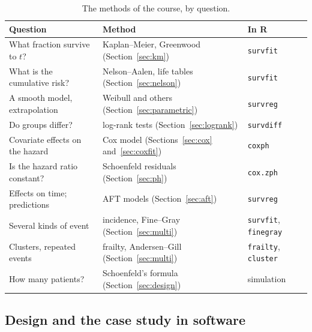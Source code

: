 \documentclass[11pt,a4paper]{article}
\numberwithin{equation}{section}
\theoremstyle{definition}
\begin{document}
\begin{table}[H]
\centering
\small
\begin{tabular}{lll}
\hline
Question & Method & In R \\
\hline
What fraction survive to $t$? & Kaplan--Meier, Greenwood (Section~\ref{sec:km}) & \texttt{survfit} \\
What is the cumulative risk? & Nelson--Aalen, life tables (Section~\ref{sec:nelson}) & \texttt{survfit} \\
A smooth model, extrapolation & Weibull and others (Section~\ref{sec:parametric}) & \texttt{survreg} \\
Do groups differ? & log-rank tests (Section~\ref{sec:logrank}) & \texttt{survdiff} \\
Covariate effects on the hazard & Cox model (Sections~\ref{sec:cox} and~\ref{sec:coxfit}) & \texttt{coxph} \\
Is the hazard ratio constant? & Schoenfeld residuals (Section~\ref{sec:ph}) & \texttt{cox.zph} \\
Effects on time; predictions & AFT models (Section~\ref{sec:aft}) & \texttt{survreg} \\
Several kinds of event & incidence, Fine--Gray (Section~\ref{sec:multi}) & \texttt{survfit}, \texttt{finegray} \\
Clusters, repeated events & frailty, Andersen--Gill (Section~\ref{sec:multi}) & \texttt{frailty}, \texttt{cluster} \\
How many patients? & Schoenfeld's formula (Section~\ref{sec:design}) & simulation \\
\hline
\end{tabular}
\caption{The methods of the course, by question.}
\label{tab:review}
\end{table}

\subsection{Design and the case study in software}
\label{ssec:software12}
\end{document}
